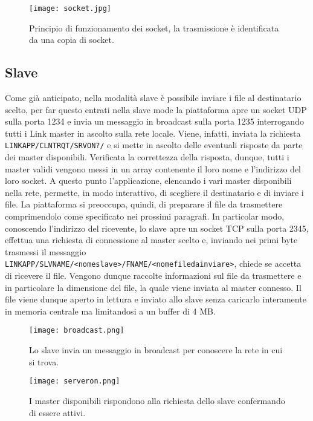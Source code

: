 \documentclass[11pt,fleqn]{book} %
\begin{document}
\begin{figure}[h]
    \centering
    \texttt{[image: socket.jpg]}
    \caption{Principio di funzionamento dei socket, la trasmissione è identificata da una copia di socket.}
    \label{fig:awesome_image}
\end{figure}


\subsection{Slave}
Come già anticipato, nella modalità slave è possibile inviare i file al destinatario scelto, per far questo entrati nella slave mode la piattaforma apre un socket UDP sulla porta 1234 e invia un messaggio in broadcast sulla porta 1235 interrogando tutti i Link master in ascolto sulla rete locale.
Viene, infatti, inviata la richiesta \texttt{LINKAPP/CLNTRQT/SRVON?/} e si mette in ascolto delle eventuali risposte da parte dei master disponibili.
Verificata la correttezza della risposta, dunque, tutti i master validi vengono messi in un array contenente il loro nome e l'indirizzo del loro socket.
A questo punto l'applicazione, elencando i vari master disponibili nella rete, permette, in modo interattivo, di scegliere il destinatario e di inviare i file.
La piattaforma si preoccupa, quindi, di preparare il file da trasmettere comprimendolo come specificato nei prossimi paragrafi.
In particolar modo, conoscendo l'indirizzo del ricevente, lo slave apre un socket TCP sulla porta 2345, effettua una richiesta di connessione al master scelto e, inviando nei primi byte trasmessi il messaggio \texttt{LINKAPP/SLVNAME/<nomeslave>/FNAME/<nomefiledainviare>}, chiede se accetta di ricevere il file.
Vengono dunque raccolte informazioni sul file da trasmettere e in particolare la dimensione del file, la quale viene inviata al master connesso.
Il file viene dunque aperto in lettura e inviato allo slave senza caricarlo interamente in memoria centrale ma limitandosi a un buffer di 4 MB.

\begin{figure}[h]
	\centering
    \texttt{[image: broadcast.png]}
    \caption{Lo slave invia un messaggio in broadcast per conoscere la rete in cui si trova.}
    \label{fig:awesome_image}
	\centering
    \texttt{[image: serveron.png]}
    \caption{I master disponibili rispondono alla richiesta dello slave confermando di essere attivi.}
    \label{fig:awesome_image}
\end{figure}
\end{document}
